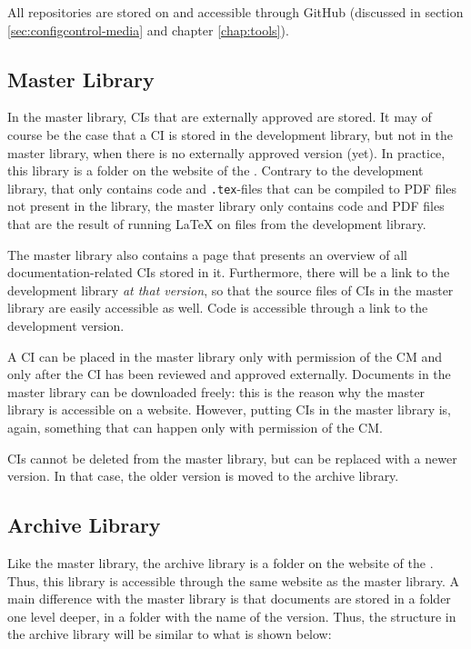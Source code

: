 All repositories are stored on and accessible through GitHub (discussed in section \ref{sec:configcontrol-media} and chapter \ref{chap:tools}).

\subsection{Master Library}
In the master library, CIs that are externally approved are stored. It may of course be the case that a CI is stored in the development library, but not in the master library, when there is no externally approved version (yet). In practice, this library is a folder on the website of the \applicationname{}. Contrary to the development library, that only contains code and \texttt{.tex}-files that can be compiled to PDF files not present in the library, the master library only contains code and PDF files that are the result of running \LaTeX{} on files from the development library.

The master library also contains a page that presents an overview of all documentation-related CIs stored in it. Furthermore, there will be a link to the development library \emph{at that version}, so that the source files of CIs in the master library are easily accessible as well. Code is accessible through a link to the development version.

A CI can be placed in the master library only with permission of the CM and only after the CI has been reviewed and approved externally. Documents in the master library can be downloaded freely: this is the reason why the master library is accessible on a website. However, putting CIs in the master library is, again, something that can happen only with permission of the CM.

CIs cannot be deleted from the master library, but can be replaced with a newer version. In that case, the older version is moved to the archive library.

\subsection{Archive Library}
Like the master library, the archive library is a folder on the website of the \applicationname{}. Thus, this library is accessible through the same website as the master library. A main difference with the master library is that documents are stored in a folder one level deeper, in a folder with the name of the version. Thus, the structure in the archive library will be similar to what is shown below:

